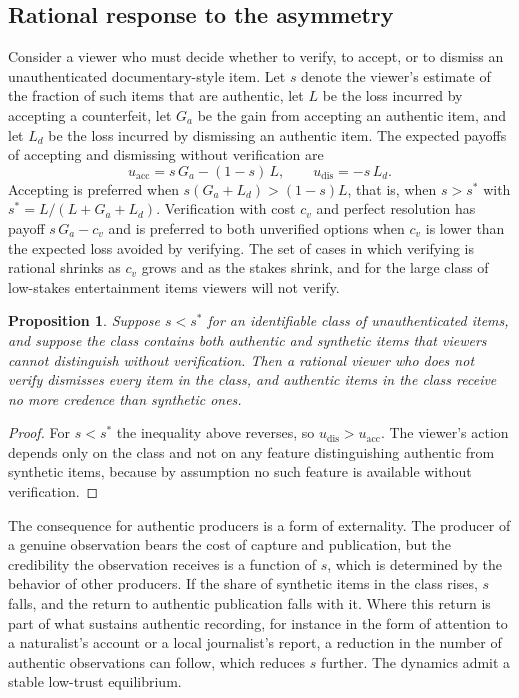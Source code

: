 \documentclass[12pt]{article}
\theoremstyle{plain}
\newtheorem{proposition}{Proposition}
\theoremstyle{definition}
\theoremstyle{remark}
\begin{document}
\subsection*{Rational response to the asymmetry}

Consider a viewer who must decide whether to verify, to accept, or to dismiss an unauthenticated documentary-style item. Let $s$ denote the viewer's estimate of the fraction of such items that are authentic, let $L$ be the loss incurred by accepting a counterfeit, let $G_a$ be the gain from accepting an authentic item, and let $L_d$ be the loss incurred by dismissing an authentic item. The expected payoffs of accepting and dismissing without verification are
\[
u_{\mathrm{acc}} = s\,G_a - (1-s)\,L, \qquad u_{\mathrm{dis}} = -s\,L_d.
\]
Accepting is preferred when $s(G_a + L_d) > (1-s)L$, that is, when $s > s^\ast$ with $s^\ast = L/(L + G_a + L_d)$. Verification with cost $c_v$ and perfect resolution has payoff $s\,G_a - c_v$ and is preferred to both unverified options when $c_v$ is lower than the expected loss avoided by verifying. The set of cases in which verifying is rational shrinks as $c_v$ grows and as the stakes shrink, and for the large class of low-stakes entertainment items viewers will not verify.

\begin{proposition}\label{prop:C1}
Suppose $s < s^\ast$ for an identifiable class of unauthenticated items, and suppose the class contains both authentic and synthetic items that viewers cannot distinguish without verification. Then a rational viewer who does not verify dismisses every item in the class, and authentic items in the class receive no more credence than synthetic ones.
\end{proposition}

\begin{proof}
For $s < s^\ast$ the inequality above reverses, so $u_{\mathrm{dis}} > u_{\mathrm{acc}}$. The viewer's action depends only on the class and not on any feature distinguishing authentic from synthetic items, because by assumption no such feature is available without verification.
\end{proof}

The consequence for authentic producers is a form of externality. The producer of a genuine observation bears the cost of capture and publication, but the credibility the observation receives is a function of $s$, which is determined by the behavior of other producers. If the share of synthetic items in the class rises, $s$ falls, and the return to authentic publication falls with it. Where this return is part of what sustains authentic recording, for instance in the form of attention to a naturalist's account or a local journalist's report, a reduction in the number of authentic observations can follow, which reduces $s$ further. The dynamics admit a stable low-trust equilibrium.
\end{document}
